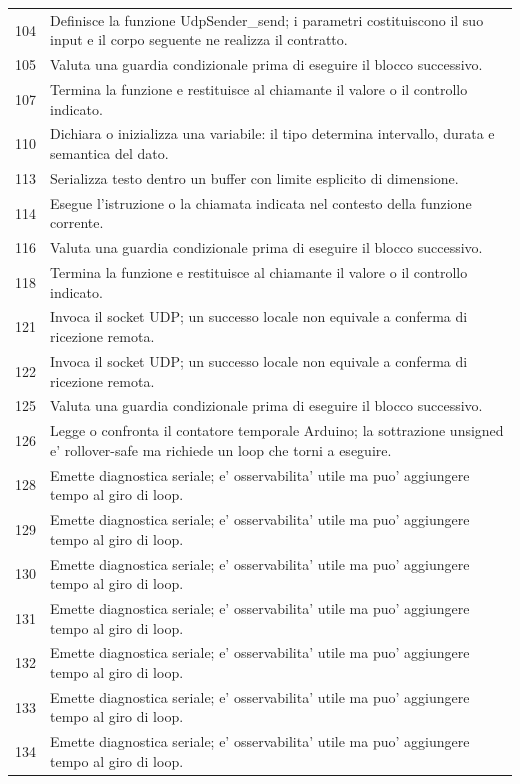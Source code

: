 \documentclass[11pt,a4paper]{article}
\begin{document}
\begin{longtable}{p{}p{}}
104 & Definisce la funzione UdpSender\_\allowbreak{}send; i parametri costituiscono il suo input e il corpo seguente ne realizza il contratto. \\
105 & Valuta una guardia condizionale prima di eseguire il blocco successivo. \\
107 & Termina la funzione e restituisce al chiamante il valore o il controllo indicato. \\
110 & Dichiara o inizializza una variabile: il tipo determina intervallo, durata e semantica del dato. \\
113 & Serializza testo dentro un buffer con limite esplicito di dimensione. \\
114 & Esegue l'istruzione o la chiamata indicata nel contesto della funzione corrente. \\
116 & Valuta una guardia condizionale prima di eseguire il blocco successivo. \\
118 & Termina la funzione e restituisce al chiamante il valore o il controllo indicato. \\
121 & Invoca il socket UDP; un successo locale non equivale a conferma di ricezione remota. \\
122 & Invoca il socket UDP; un successo locale non equivale a conferma di ricezione remota. \\
125 & Valuta una guardia condizionale prima di eseguire il blocco successivo. \\
126 & Legge o confronta il contatore temporale Arduino; la sottrazione unsigned e' rollover-safe ma richiede un loop che torni a eseguire. \\
128 & Emette diagnostica seriale; e' osservabilita' utile ma puo' aggiungere tempo al giro di loop. \\
129 & Emette diagnostica seriale; e' osservabilita' utile ma puo' aggiungere tempo al giro di loop. \\
130 & Emette diagnostica seriale; e' osservabilita' utile ma puo' aggiungere tempo al giro di loop. \\
131 & Emette diagnostica seriale; e' osservabilita' utile ma puo' aggiungere tempo al giro di loop. \\
132 & Emette diagnostica seriale; e' osservabilita' utile ma puo' aggiungere tempo al giro di loop. \\
133 & Emette diagnostica seriale; e' osservabilita' utile ma puo' aggiungere tempo al giro di loop. \\
134 & Emette diagnostica seriale; e' osservabilita' utile ma puo' aggiungere tempo al giro di loop. \\

\end{longtable}
\end{document}
